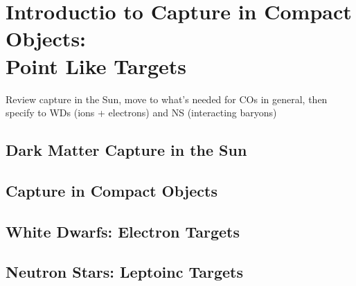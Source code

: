 \graphicspath{{img/chapter_2/}}

\chapter{Introductio to Capture in Compact Objects:\\ Point Like Targets}
\label{chapter:capture_1}

\begin{synopsis}
  Review capture in the Sun, move to what's needed for COs in general, then specify to WDs (ions + electrons) and NS (interacting baryons)
\end{synopsis}

\section{Dark Matter Capture in the Sun}



\section{Capture in Compact Objects}

\section{White Dwarfs: Electron Targets}

\section{Neutron Stars: Leptoinc Targets}
